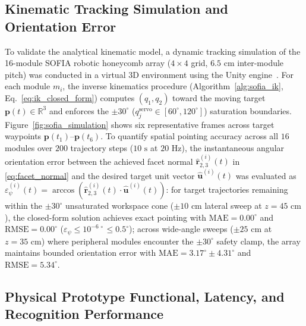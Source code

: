 \documentclass[lettersize,journal]{IEEEtran}
\begin{document}
	\subsection{Kinematic Tracking Simulation and Orientation Error}
	\label{sec:results_simulation}
	To validate the analytical kinematic model, a dynamic tracking simulation of the 16-module SOFIA robotic honeycomb array ($4 \times 4$ grid, $6.5\text{ cm}$ inter-module pitch) was conducted in a virtual 3D environment using the Unity engine~\cite{unity2023engine}. For each module $m_i$, the inverse kinematics procedure (Algorithm~\ref{alg:sofia_ik}, Eq.~\eqref{eq:ik_closed_form}) computes $(q_1,q_2)$ toward the moving target $\mathbf{p}(t) \in \mathbb{R}^3$ and enforces the $\pm 30^\circ$ ($q_j^{\text{servo}} \in [60^\circ, 120^\circ]$) saturation boundaries. Figure~\ref{fig:sofia_simulation} shows six representative frames across target waypoints $\mathbf{p}(t_1)\text{--}\mathbf{p}(t_6)$. To quantify spatial pointing accuracy across all $16$ modules over $200$ trajectory steps ($10\text{ s}$ at $20\text{ Hz}$), the instantaneous angular orientation error between the achieved facet normal $\hat{\mathbf{r}}_{2,3}^{(i)}(t)$ in \eqref{eq:facet_normal} and the desired target unit vector $\hat{\mathbf{u}}^{(i)}(t)$ was evaluated as $\varepsilon_\psi^{(i)}(t) = \arccos(\hat{\mathbf{r}}_{2,3}^{(i)}(t) \cdot \hat{\mathbf{u}}^{(i)}(t))$: for target trajectories remaining within the $\pm 30^\circ$ unsaturated workspace cone ($\pm 10\text{ cm}$ lateral sweep at $z = 45\text{ cm}$), the closed-form solution achieves exact pointing with $\text{MAE} = 0.00^\circ$ and $\text{RMSE} = 0.00^\circ$ ($\varepsilon_\psi \le 10^{-6\,\circ} \le 0.5^\circ$); across wide-angle sweeps ($\pm 25\text{ cm}$ at $z = 35\text{ cm}$) where peripheral modules encounter the $\pm 30^\circ$ safety clamp, the array maintains bounded orientation error with $\text{MAE} = 3.17^\circ \pm 4.31^\circ$ and $\text{RMSE} = 5.34^\circ$.
	
	\subsection{Physical Prototype Functional, Latency, and Recognition Performance}
	\label{sec:physical_validation}
	\label{sec:functional_performance}
	
\end{document}
